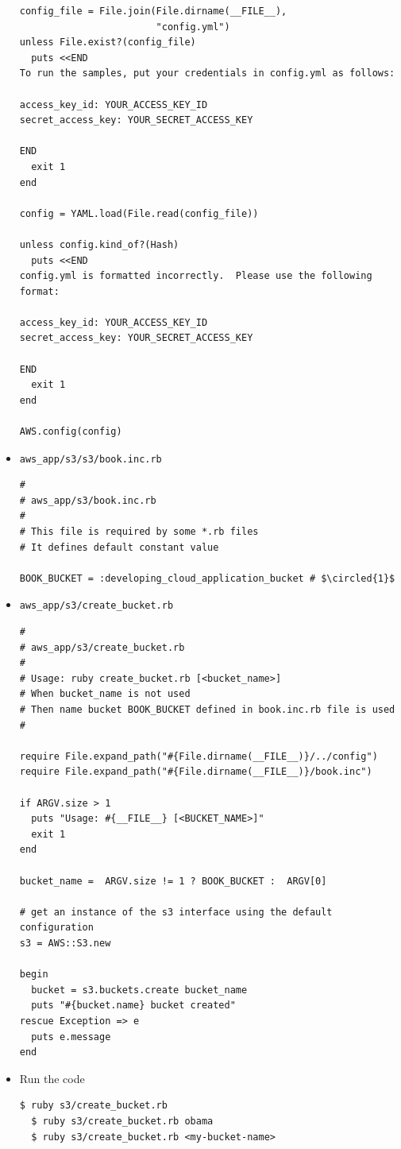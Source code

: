 \documentclass{beamer}
\newcommand*\circled[1]{\tikz[baseline=(char.base)]{
            \node[shape=circle,draw,inner sep=2pt] (char) {#1};}}
\begin{document}
\begin{frame}
\begin{itemize}
\begin{lstlisting}[escapechar=$]
config_file = File.join(File.dirname(__FILE__),
                        "config.yml")
unless File.exist?(config_file)
  puts <<END
To run the samples, put your credentials in config.yml as follows:

access_key_id: YOUR_ACCESS_KEY_ID
secret_access_key: YOUR_SECRET_ACCESS_KEY

END
  exit 1
end

config = YAML.load(File.read(config_file))

unless config.kind_of?(Hash)
  puts <<END
config.yml is formatted incorrectly.  Please use the following format:

access_key_id: YOUR_ACCESS_KEY_ID
secret_access_key: YOUR_SECRET_ACCESS_KEY

END
  exit 1
end

AWS.config(config)
\end{lstlisting}

\item \texttt{aws\_app/s3/s3/book.inc.rb}
\lstset{language=Ruby, style=eclipse}
\begin{lstlisting}[escapechar=$]
#
# aws_app/s3/book.inc.rb
#
# This file is required by some *.rb files
# It defines default constant value

BOOK_BUCKET = :developing_cloud_application_bucket # $\circled{1}$
\end{lstlisting}

\item \texttt{aws\_app/s3/create\_bucket.rb}
\lstset{language=Ruby, style=eclipse}
\begin{lstlisting}[escapechar=$]
#
# aws_app/s3/create_bucket.rb
#
# Usage: ruby create_bucket.rb [<bucket_name>]
# When bucket_name is not used
# Then name bucket BOOK_BUCKET defined in book.inc.rb file is used
#

require File.expand_path("#{File.dirname(__FILE__)}/../config")
require File.expand_path("#{File.dirname(__FILE__)}/book.inc")

if ARGV.size > 1
  puts "Usage: #{__FILE__} [<BUCKET_NAME>]"
  exit 1
end

bucket_name =  ARGV.size != 1 ? BOOK_BUCKET :  ARGV[0]

# get an instance of the s3 interface using the default configuration
s3 = AWS::S3.new

begin
  bucket = s3.buckets.create bucket_name
  puts "#{bucket.name} bucket created"
rescue Exception => e
  puts e.message
end
\end{lstlisting}

\item Run the code
\lstset{language=shell}
\begin{lstlisting}[escapechar=!]
  $ ruby s3/create_bucket.rb
  $ ruby s3/create_bucket.rb obama
  $ ruby s3/create_bucket.rb <my-bucket-name>
\end{lstlisting}

\end{itemize}
\end{frame}
\end{document}
